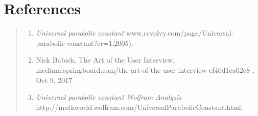 \documentclass[12pt]{report}
\begin{document}
 











\newpage
\chapter{References}
\begin{quote}
    

\begin{enumerate}
\item  {\it Universal parabolic constant\/} www.revolvy.com/page/Universal-parabolic-constant?cr=1,2005).
\item Nick Babich, The Art of the User Interview, {medium.springboard.com/the-art-of-the-user-interview-cf40d1ca62e8 , Oct 9, 2017}
\item  {\it Universal parabolic constant Wolfram Analysis\\}   
http://mathworld.wolfram.com/UniversalParabolicConstant.html.
\end{enumerate}


        

\end{quote}
\end{document}
